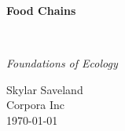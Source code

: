 \clearpage
\vspace*{1.5in}
\begin{center}
  \begin{minipage}{\textwidth}
    \centering
    \Huge\bfseries
    \linespread{1.25}\selectfont
  Food Chains
  \end{minipage}
  \\[3em]
  {\Large\itshape\linespread{1.3}\selectfont
  Foundations of Ecology\par}
  \vfill
  {\large Skylar Saveland}
  \\[1em]
  {\large Corpora Inc}
  \\[1em]
  {\large \today}
\end{center}
\clearpage
